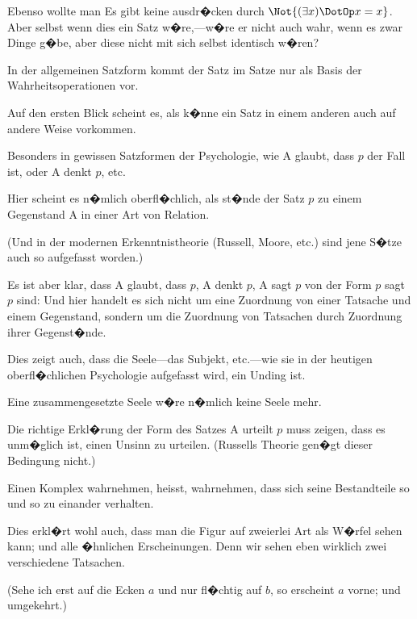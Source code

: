 \begin{propositions}
{Ebenso wollte man \glqq{}Es gibt keine \grqq{} ausdr�cken
durch \glqq{}$\Not{(\exists x) \DotOp x = x}$\grqq{}. Aber selbst wenn
dies ein Satz w�re,---w�re er nicht auch wahr, wenn
es zwar \glqq{}Dinge g�be\grqq{}, aber diese nicht mit sich
selbst identisch w�ren?}


{In der allgemeinen Satzform kommt der Satz im
Satze nur als Basis der Wahrheitsoperationen vor.}


{Auf den ersten Blick scheint es, als k�nne ein Satz
in einem anderen auch auf andere Weise vorkommen.

Besonders in gewissen Satzformen der Psychologie,
wie \glqq{}A glaubt, dass $p$ der Fall ist\grqq{}, oder
\glqq{}A denkt $p$\grqq{}, etc.

Hier scheint es n�mlich oberfl�chlich, als st�nde
der Satz $p$ zu einem Gegenstand A in einer Art
von Relation.

(Und in der modernen Erkenntnistheorie (Russell,
Moore, etc.) sind jene S�tze auch so aufgefasst
worden.)}


{Es ist aber klar, dass \glqq{}A glaubt, dass $p$\grqq{}, \glqq{}A
denkt $p$\grqq{}, \glqq{}A sagt $p$\grqq{} von der Form \glqq{}\glq{}$p$\grq{} sagt $p$\grqq{} sind:
Und hier handelt es sich nicht um eine Zuordnung
von einer Tatsache und einem Gegenstand, sondern
um die Zuordnung von Tatsachen durch Zuordnung
ihrer Gegenst�nde.}


{Dies zeigt auch, dass die Seele---das Subjekt,
etc.---wie sie in der heutigen oberfl�chlichen Psychologie
aufgefasst wird, ein Unding ist.

{\verystretchyspace
Eine zusammengesetzte Seele w�re n�mlich
keine Seele mehr.}}


{Die richtige Erkl�rung der Form des Satzes \glqq{}A
urteilt $p$\grqq{} muss zeigen, dass es unm�glich ist, einen
Unsinn zu urteilen. (Russells Theorie gen�gt
dieser Bedingung nicht.)}


{Einen Komplex wahrnehmen, heisst, wahrnehmen,
dass sich seine Bestandteile so und so zu einander
verhalten.

Dies erkl�rt wohl auch, dass man die Figur
auf zweierlei Art als W�rfel sehen kann; und alle
�hnlichen Erscheinungen. Denn wir sehen eben
wirklich zwei verschiedene Tatsachen.

(Sehe ich erst auf die Ecken $a$ und nur fl�chtig
auf $b$, so erscheint $a$ vorne; und umgekehrt.)}



\end{propositions}
